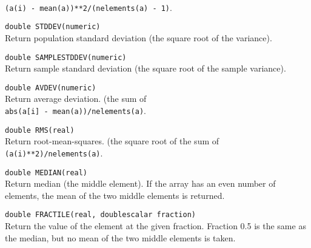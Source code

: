 \begin{description}
    \\\texttt{(a(i) - mean(a))**2/(nelements(a) - 1)}.
  \item[] \texttt{double STDDEV(numeric)}\\
    Return population standard deviation (the square root of the variance).
  \item[] \texttt{double SAMPLESTDDEV(numeric)}\\
    Return sample standard deviation (the square root of the sample variance).
  \item[] \texttt{double AVDEV(numeric)}\\
    Return average deviation. (the sum of
    \\\texttt{abs(a[i] - mean(a))/nelements(a)}.
  \item[] \texttt{double RMS(real)}\\
    Return root-mean-squares. (the square root of the sum of
    \\\texttt{(a(i)**2)/nelements(a)}.
  \item[] \texttt{double MEDIAN(real)}\\
    Return median (the middle element).
    If the array has an even number of elements, the mean of
    the two middle elements is returned.
  \item[] \texttt{double FRACTILE(real, doublescalar fraction)}\\
    Return the value of the element at the given fraction.
    Fraction 0.5 is the same as the median, but no mean of the two middle
    elements is taken.
\end{description}

